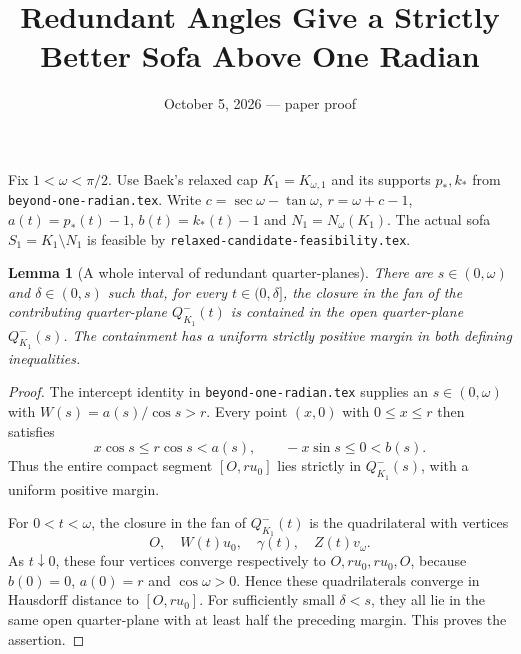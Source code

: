 \documentclass[11pt]{article}
\title{Redundant Angles Give a Strictly Better Sofa Above One Radian}
\author{}\date{October 5, 2026 --- paper proof}
\newtheorem{lemma}{Lemma}
\begin{document}
\maketitle
Fix $1<\omega<\pi/2$. Use Baek's relaxed cap $K_1=K_{\omega,1}$ and its supports $p_*,k_*$ from \texttt{beyond-one-radian.tex}. Write $c=\sec\omega-\tan\omega$, $r=\omega+c-1$, $a(t)=p_*(t)-1$, $b(t)=k_*(t)-1$ and $N_1=N_\omega(K_1)$. The actual sofa $S_1=K_1\setminus N_1$ is feasible by \texttt{relaxed-candidate-feasibility.tex}.

\begin{lemma}[A whole interval of redundant quarter-planes]\label{lem:redundant}
There are $s\in(0,\omega)$ and $\delta\in(0,s)$ such that, for every $t\in(0,\delta]$, the closure in the fan of the contributing quarter-plane $Q^-_{K_1}(t)$ is contained in the open quarter-plane $Q^-_{K_1}(s)$. The containment has a uniform strictly positive margin in both defining inequalities.
\end{lemma}
\begin{proof}
The intercept identity in \texttt{beyond-one-radian.tex} supplies an $s\in(0,\omega)$ with $W(s)=a(s)/\cos s>r$. Every point $(x,0)$ with $0\le x\le r$ then satisfies
\[
 x\cos s\le r\cos s<a(s),\qquad -x\sin s\le0<b(s).
\]
Thus the entire compact segment $[O,r u_0]$ lies strictly in $Q^-_{K_1}(s)$, with a uniform positive margin.

For $0<t<\omega$, the closure in the fan of $Q^-_{K_1}(t)$ is the quadrilateral with vertices
\[
 O,\quad W(t)u_0,\quad\gamma(t),\quad Z(t)v_\omega.
\]
As $t\downarrow0$, these four vertices converge respectively to $O,r u_0,r u_0,O$, because $b(0)=0$, $a(0)=r$ and $\cos\omega>0$. Hence these quadrilaterals converge in Hausdorff distance to $[O,r u_0]$. For sufficiently small $\delta<s$, they all lie in the same open quarter-plane with at least half the preceding margin. This proves the assertion.
\end{proof}
\end{document}

